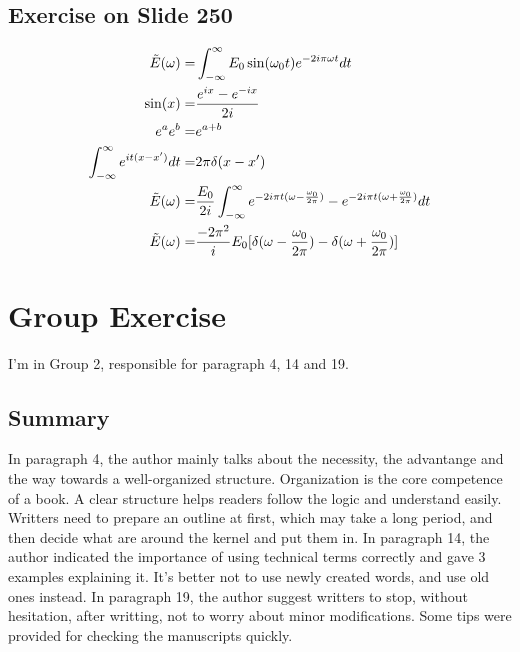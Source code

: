 \documentclass[paper=a4, fontsize=11pt]{scrartcl} %
\numberwithin{equation}{section} %
\numberwithin{figure}{section} %
\numberwithin{table}{section} %
\begin{document}
	\subsection{Exercise on Slide 250}
		\begin{equation}\notag
			\begin{aligned}
				\tilde{E}(\omega)=& \int_{-\infty}^{\infty}E_0\sin(\omega_0t)e^{-2i\pi\omega t}dt \\
				\sin(x)= & \frac{e^{ix}-e^{-ix}}{2i} \\
				e^ae^b= & e^{a+b} \\
				\int_{-\infty}^{\infty}e^{it(x-x')}dt=&2\pi \delta(x-x')\\
				\tilde{E}(\omega)=& \frac{E_0}{2i}\int_{-\infty}^{\infty}e^{-2i\pi t(\omega-\frac{\omega_0}{2\pi})}-e^{-2i\pi t(\omega+\frac{\omega_0}{2\pi})}dt \\
				\tilde{E}(\omega)=&\frac{-2\pi^2}{i}E_0[\delta(\omega-\frac{\omega_0}{2\pi})-\delta(\omega+\frac{\omega_0}{2\pi})]
			\end{aligned}
		\end{equation}
		
\section{Group Exercise}
	I'm in Group 2, responsible for paragraph 4, 14 and 19.
	\subsection{Summary}
		In paragraph 4, the author mainly talks about the necessity, the advantange and the way towards a well-organized structure. Organization is the core competence of a book. A clear structure helps readers follow the logic and understand easily. Writters need to prepare an outline at first, which may take a long period, and then decide what are around the kernel and put them in.\newline
		In paragraph 14, the author indicated the importance of using technical terms correctly and gave 3 examples explaining it. It's better not to use newly created words, and use old ones instead.\newline
		In paragraph 19, the author suggest writters to stop, without hesitation, after writting, not to worry about minor modifications. Some tips were provided for checking the manuscripts quickly.  
		
\end{document}

